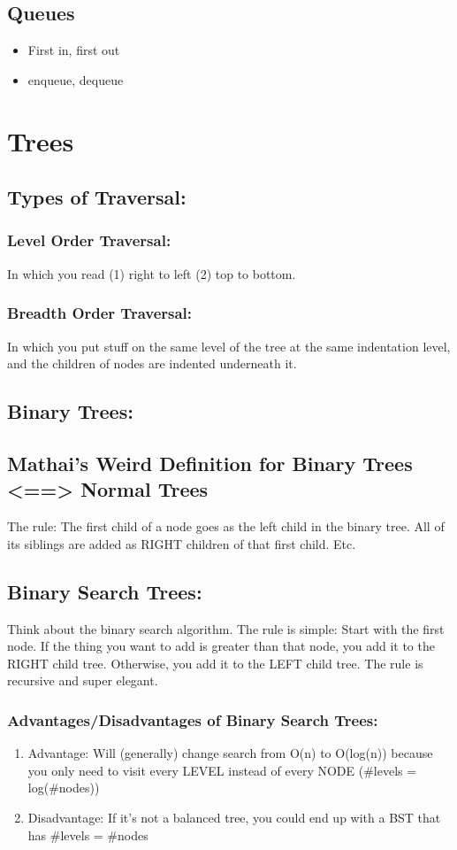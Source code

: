 \documentclass[a4paper,12pt]{article}
\begin{document}
\subsection{Queues}
\begin{itemize}
\item First in, first out
\item enqueue, dequeue
\end{itemize}

\section{Trees}
\subsection{Types of Traversal:}
\subsubsection{Level Order Traversal: }
In which you read (1) right to left (2) top to bottom.
\subsubsection{Breadth Order Traversal: }
In which you put stuff on the same level of the tree at the same indentation level, and the children of nodes are indented underneath it.

\subsection{Binary Trees: }
\subsection{Mathai's Weird Definition for Binary Trees <==> Normal Trees}
The rule: The first child of a node goes as the left child in the binary tree. All of its siblings are added as RIGHT children of that first child. Etc.
\subsection{Binary Search Trees: }
Think about the binary search algorithm. The rule is simple: Start with the first node. If the thing you want to add is greater than that node, you add it to the RIGHT child tree. Otherwise, you add it to the LEFT child tree. The rule is recursive and super elegant.
\subsubsection{Advantages/Disadvantages of Binary Search Trees: }
\begin{enumerate}
\item Advantage: Will (generally) change search from O(n) to O(log(n)) because you only need to visit every LEVEL instead of every NODE (\#levels = log(\#nodes))
\item Disadvantage: If it's not a balanced tree, you could end up with a BST that has \#levels = \#nodes
\end{enumerate}
\end{document}

